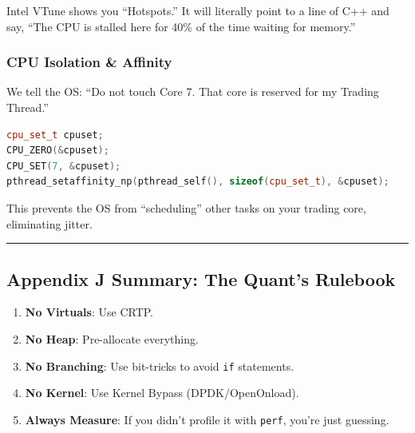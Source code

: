 Intel VTune shows you ``Hotspots.'' It will literally point to a line of
C++ and say, ``The CPU is stalled here for 40\% of the time waiting for
memory.''

\hypertarget{cpu-isolation-affinity}{%
\subsubsection{CPU Isolation \& Affinity}\label{cpu-isolation-affinity}}

We tell the OS: ``Do not touch Core 7. That core is reserved for my
Trading Thread.''

\begin{lstlisting}[language={C++}]
cpu_set_t cpuset;
CPU_ZERO(&cpuset);
CPU_SET(7, &cpuset);
pthread_setaffinity_np(pthread_self(), sizeof(cpu_set_t), &cpuset);
\end{lstlisting}

This prevents the OS from ``scheduling'' other tasks on your trading
core, eliminating jitter.

\begin{center}\rule{0.5\linewidth}{0.5pt}\end{center}

\hypertarget{appendix-j-summary-the-quants-rulebook}{%
\subsection{Appendix J Summary: The Quant's
Rulebook}\label{appendix-j-summary-the-quants-rulebook}}

\begin{enumerate}
\def\labelenumi{\arabic{enumi}.}
\tightlist
\item
  \textbf{No Virtuals}: Use CRTP.
\item
  \textbf{No Heap}: Pre-allocate everything.
\item
  \textbf{No Branching}: Use bit-tricks to avoid
  \passthrough{\lstinline!if!} statements.
\item
  \textbf{No Kernel}: Use Kernel Bypass (DPDK/OpenOnload).
\item
  \textbf{Always Measure}: If you didn't profile it with
  \passthrough{\lstinline!perf!}, you're just guessing.
\end{enumerate}
